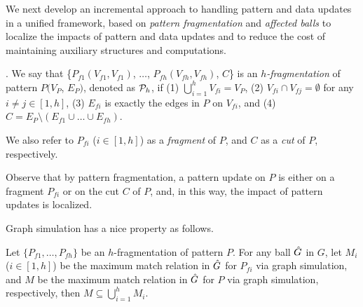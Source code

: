 
\vspace{1.0ex}
We next develop an incremental approach to handling pattern and data updates in a unified framework, based on {\em pattern fragmentation} and {\em affected balls}
to localize the impacts of pattern and data updates and to reduce the cost of maintaining auxiliary structures and computations.


. We say that \{$P_{f1}(V_{f1},V_{f1})$, $\ldots$, $P_{fh}(V_{fh},V_{fh})$, $C$\} is an {\em $h$-fragmentation} of pattern $P(V_{P}$, $E_{P})$, denoted as ${\cal P}_{h}$,
if (1) $\bigcup_{i=1}^{h}V_{fi}=V_{P}$, (2) $V_{fi}\cap V_{fj} = \emptyset$ for any $i\ne j\in[1, h]$,
(3) $E_{fi}$ is exactly the edges in $P$ on $V_{fi}$, and (4) $C=E_P \setminus (E_{f1}\cup\ldots\cup E_{fh})$.

We also refer to $P_{fi}$ ($i\in[1,h]$) as a {\em fragment} of $P$, and $C$ as a {\em cut} of $P$, respectively.

Observe that by pattern fragmentation, a pattern update on $P$ is either on a fragment $P_{fi}$ or on the cut $C$ of $P$, and, in this way, the impact of pattern updates is localized. %

\vspace{0.5ex}
Graph simulation has a nice property as follows.

\vspace{-0.5ex}
\begin{theorem}
\label{thm-compose}
Let $\{P_{f1},\ldots,P_{fh}\}$ be an $h$-fragmentation of pattern $P$.
For any ball $\hat{G}{}$ in $G$, let $M_i$ ($i\in[1,h]$) be the maximum match relation in $\hat{G}{}$ for $P_{fi}$ via graph simulation,
and $M$ be the maximum match relation in $\hat{G}{}$ for $P$ via graph simulation, respectively,
then $M\subseteq\bigcup_{i=1}^{h}M_{i}$.
\end{theorem}

